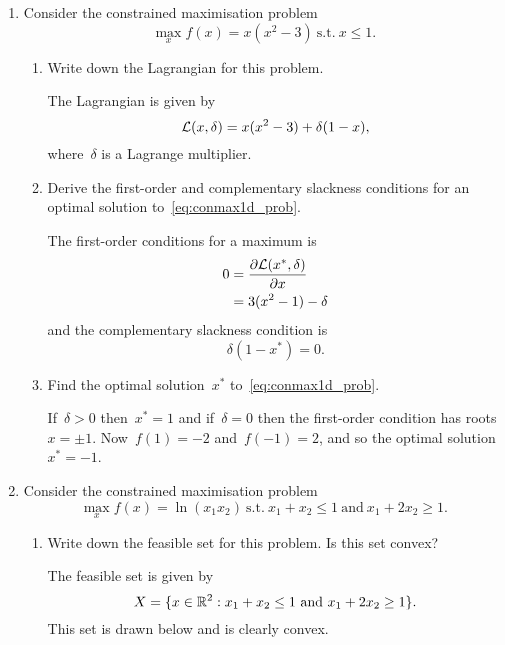 
\begin{enumerate}

	\item
	Consider the constrained maximisation problem
	\[ \max_xf(x)=x(x^2-3)\ \text{s.t.}\ x\le1. 
		\label{eq:conmax1d_prob} \]
	\begin{enumerate}

		\item
		Write down the Lagrangian for this problem.
		\begin{solution}
			The Lagrangian is given by
			\[ \Lcal(x,\delta)=x(x^2-3)+\delta(1-x), \]
			where~$\delta$ is a Lagrange multiplier.
		\end{solution}

		\item
		Derive the first-order and complementary slackness conditions for an optimal solution to~\eqref{eq:conmax1d_prob}.
		\begin{solution}
			The first-order conditions for a maximum is
			\begin{align}
				0
				&= \pder{\Lcal(x^*,\delta)}{x}\\
				&= 3(x^2-1)-\delta
			\end{align}
			and the complementary slackness condition is
			\[ \delta(1-x^*)=0. \]
		\end{solution}

		\item
		Find the optimal solution~$x^*$ to~\eqref{eq:conmax1d_prob}.
		\begin{solution}
			If~$\delta>0$ then~$x^*=1$ and if~$\delta=0$ then the first-order condition has roots~$x=\pm1$.
			Now~$f(1)=-2$ and~$f(-1)=2$, and so the optimal solution~$x^*=-1$.
		\end{solution}

	\end{enumerate}

	\item
	Consider the constrained maximisation problem
	\[ \max_xf(x)%
		=\ln(x_1x_2)\ \text{s.t.}\ %
			x_1+x_2\le1\ \text{and}\ x_1+2x_2\ge1. 
		\label{eq:conmax2d_prob} \]
	\begin{enumerate}

		\item
		Write down the feasible set for this problem.
		Is this set convex?
		\begin{solution}
			The feasible set is given by
			\[ X=\{x\in\R^2:x_1+x_2\le1\ \text{and}\ x_1+2x_2\ge1\}. \]
			This set is drawn below and is clearly convex.
			\begin{center}
				\begin{tikzpicture}[scale=1.5]


\end{tikzpicture}
\end{center}
\end{solution}
\end{enumerate}
\end{enumerate}
